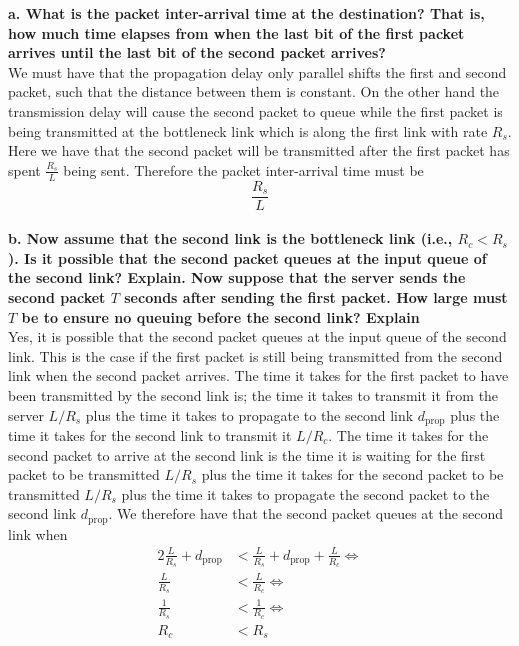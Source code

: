 \textbf{a. What is the packet inter-arrival time at the destination? That is, how much time elapses from when the last bit of the first packet arrives until the last bit of the second packet arrives?} \\
We must have that the propagation delay only parallel shifts the first and second packet, such that the distance between them is constant. On the other hand the transmission delay will cause the second packet to queue while the first packet is being transmitted at the bottleneck link which is along the first link with rate $R_s$. Here we have that the second packet will be transmitted after the first packet has spent $\frac{R_s}{L}$ being sent. Therefore the packet inter-arrival time must be
\begin{equation*}
    \frac{R_s}{L}
\end{equation*}
\\
\textbf{b. Now assume that the second link is the bottleneck link (i.e., $R_c < R_s$). Is it possible that the second packet queues at the input queue of the second link? Explain. Now suppose that the server sends the second packet $T$ seconds after sending the first packet. How large must $T$ be to ensure no queuing before the second link? Explain} \\
Yes, it is possible that the second packet queues at the input queue of the second link. This is the case if the first packet is still being transmitted from the second link when the second packet arrives. The time it takes for the first packet to have been transmitted by the second link is; the time it takes to transmit it from the server $L/R_s$ plus the time it takes to propagate to the second link $d_{\text{prop}}$ plus the time it takes for the second link to transmit it $L/R_c$. The time it takes for the second packet to arrive at the second link is the time it is waiting for the first packet to be transmitted $L/R_s$ plus the time it takes for the second packet to be transmitted $L/R_s$ plus the time it takes to propagate the second packet to the second link $d_{\text{prop}}$. We therefore have that the second packet queues at the second link when
\begin{equation*}
\begin{split}
    2\frac{L}{R_s} + d_{\text{prop}} &< \frac{L}{R_s} + d_{\text{prop}} + \frac{L}{R_c} \Longleftrightarrow \\
    \frac{L}{R_s}  &<  \frac{L}{R_c} \Longleftrightarrow \\
    \frac{1}{R_s} &< \frac{1}{R_c} \Longleftrightarrow \\
    R_c &< R_s
\end{split}
\end{equation*}
